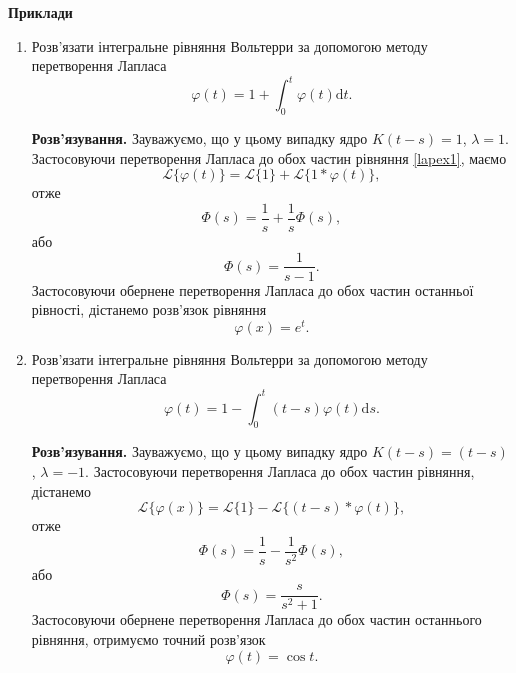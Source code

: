 \documentclass[14pt,twoside]{extreport}
\theoremstyle{mystyle}
\numberwithin{equation}{chapter}
\begin{document}
\begin{small}
	\textbf{Приклади}
	\begin{enumerate}
		\item Розв'язати інтегральне рівняння Вольтерри за допомогою методу перетворення Лапласа
		\begin{equation}\label{lapex1}
		\varphi(t)=1+\displaystyle \int_{0}^{t}\varphi(t)\mathrm{d}t.
		\end{equation}
		
		\textbf{Розв'язування.}
		Зауважуємо, що у цьому випадку ядро $K(t-s)=1$, $\lambda=1$. Застосовуючи перетворення Лапласа до обох частин рівняння \eqref{lapex1}, маємо
		\begin{equation*}
			\mathcal{L}\{\varphi(t)\}=\mathcal{L}\{1\}+\mathcal{L}\{1*\varphi(t)\},
		\end{equation*}
		отже
		\begin{equation*}
			\Phi(s)=\displaystyle \frac{1}{s}+\frac{1}{s}\Phi(s),
		\end{equation*}
		або
		\begin{equation*}
			\Phi(s)=\displaystyle \frac{1}{s-1}.
		\end{equation*}
		Застосовуючи обернене перетворення Лапласа до обох частин останньої рівності, дістанемо розв'язок рівняння
		\begin{equation*}
			\varphi(x)=e^{t}.
		\end{equation*}
		
		\item Розв'язати інтегральне рівняння Вольтерри за допомогою методу перетворення Лапласа
		\begin{equation*}
			\varphi(t)=1-\int_{0}^{t}(t-s)\varphi(t)\mathrm{d}s.
		\end{equation*}
		
		\textbf{Розв'язування.}
		Зауважуємо, що у цьому випадку ядро $K(t-s)=(t-s)$, $\lambda=-1$. Застосовуючи перетворення Лапласа до обох частин рівняння, дістанемо
		\begin{equation*}
			\mathcal{L}\{\varphi(x)\}=\mathcal{L}\{1\}-\mathcal{L}\{(t-s)*\varphi(t)\},
		\end{equation*}
		отже
		\begin{equation*}
			\Phi(s)=\displaystyle \frac{1}{s}-\frac{1}{s^{2}}\Phi(s),
		\end{equation*}
		або
		\begin{equation*}
			\Phi(s)=\displaystyle \frac{s}{s^{2}+1}.
		\end{equation*}
		Застосовуючи обернене перетворення Лапласа до обох частин останнього рівняння, отримуємо точний розв'язок
		\begin{equation*}
			\varphi(t)=\cos t.
		\end{equation*}
		

\end{enumerate}
\end{small}
\end{document}
